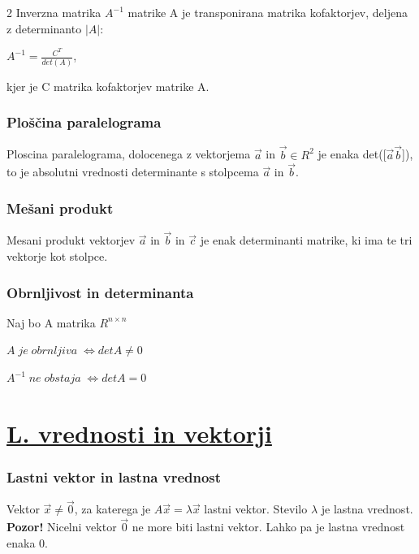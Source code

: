 \documentclass{article}
\begin{document}
\begin{multicols}{2}
	Inverzna matrika $A^{-1}$ matrike A je transponirana matrika kofaktorjev,
	deljena z determinanto $|A|$:
	\begin{center}
		$A^{-1} = \frac{C^{T}}{det(A)}$,
	\end{center}
	kjer je C matrika kofaktorjev matrike A.

	\subsubsection{Ploščina paralelograma}

	Ploscina paralelograma, dolocenega z vektorjema $\vec{a}$ in $\vec{b} \in R^{2}$ je
	enaka det([$\vec{a} \vec{b}$]), to je absolutni vrednosti determinante s stolpcema $\vec{a}$ in $\vec{b}$.

	\subsubsection{Mešani produkt}

	Mesani produkt vektorjev $\vec{a}$ in $\vec{b}$ in $\vec{c}$ je enak determinanti matrike, ki
	ima te tri vektorje kot stolpce.

	\subsubsection{Obrnljivost in determinanta}

	Naj bo A matrika $R^{n\times n}$
	\begin{center}
		\begin{math}
			A\; je\; obrnljiva\; \iff detA \neq 0
		\end{math}
	\end{center}
	\begin{center}
		\begin{math}
			A^{-1}\; ne\; obstaja\; \iff detA = 0
		\end{math}
	\end{center}

	\section{\underline{L. vrednosti in vektorji}}

	\subsubsection{Lastni vektor in lastna vrednost}

	Vektor $\vec{x} \neq \vec{0}$, za katerega je $A\vec{x} = \lambda \vec{x}$ lastni vektor. Stevilo
	$\lambda$ je lastna vrednost.
	\textbf{Pozor!} Nicelni vektor $\vec{0}$ ne more biti lastni vektor. Lahko pa je lastna vrednost enaka 0.


\end{multicols}
\end{document}
